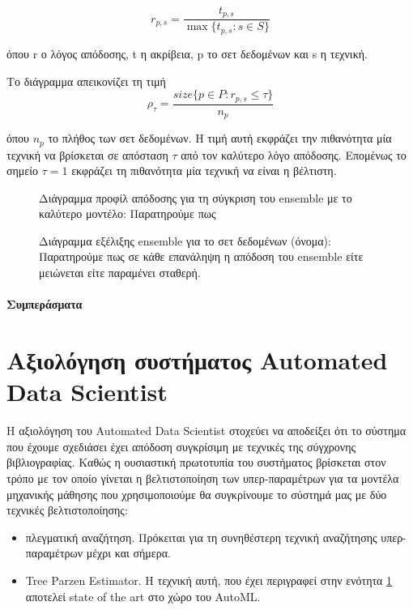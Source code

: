 \begin{equation}
r_{p,s}= \frac{t_{p,s}}{\max\{{t_{p,s} : s \in S}\}}    
\end{equation} 

όπου r ο λόγος απόδοσης, t η ακρίβεια, p το σετ δεδομένων και s η τεχνική.

Το διάγραμμα απεικονίζει τη τιμή
\begin{equation}
\rho_{\tau}= \frac{size\{{p \in P : r_{p,s} \leq \tau  }\}}{n_p}   
\end{equation}

όπου $n_p$ το πλήθος των σετ δεδομένων. Η τιμή αυτή εκφράζει την πιθανότητα μία τεχνική να βρίσκεται σε απόσταση $\tau$ από τον καλύτερο λόγο απόδοσης.  Επομένως το σημείο $\tau = 1$ εκφράζει τη πιθανότητα μία τεχνική να είναι η βέλτιστη.


\begin{figure}[!htb]
	\begin{center}
		\caption{Διάγραμμα προφίλ απόδοσης για τη σύγκριση του ensemble με το καλύτερο μοντέλο: Παρατηρούμε πως }
	\end{center}
\end{figure}

\begin{figure}[!htb]
	\begin{center}
		\caption{Διάγραμμα εξέλιξης ensemble για το σετ δεδομένων (όνομα): Παρατηρούμε πως σε κάθε επανάληψη η απόδοση του ensemble είτε μειώνεται είτε παραμένει σταθερή. }
	\end{center}
\end{figure} 	

\paragraph{Συμπεράσματα}
\section{Αξιολόγηση συστήματος Automated Data Scientist}
Η αξιολόγηση του Automated Data Scientist στοχεύει να αποδείξει ότι το σύστημα που έχουμε σχεδιάσει έχει απόδοση συγκρίσιμη με τεχνικές της σύγχρονης βιβλιογραφίας. Καθώς η ουσιαστική πρωτοτυπία του συστήματος βρίσκεται στον τρόπο με τον οποίο γίνεται η βελτιστοποίηση των υπερ-παρα\-μέ\-τρων για τα μοντέλα μηχανικής μάθησης που χρησιμοποιούμε θα συγκρίνουμε το σύστημά μας με δύο τεχνικές βελτιστοποίησης:
\begin{itemize}
	\item πλεγματική αναζήτηση. Πρόκειται για τη συνηθέστερη τεχνική αναζήτησης υπερ-παραμέτρων μέχρι και σήμερα.
	\item Tree Parzen Estimator. Η τεχνική αυτή, που έχει περιγραφεί στην ενότητα \ref{} αποτελεί state of the art στο χώρο του AutoML.
\end{itemize}

